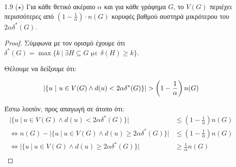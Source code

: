 \documentclass[a4paper, oneside, 11pt]{article}
\theoremstyle{definition}
\begin{document}
\begin{enumerate}
\begin{proof}
      \begin{align*}
         E[d] &= \frac{1}{{n(G) \choose 2}} \sum_{u, v \in V(G): u \neq v}
                  d(u, v)\\
              &= \frac{1}{{2^r \choose 2}} \sum_{u \in V(G)}
                  \sum_{v \in V(G): v \neq u} d(u, v)\\
              &= \frac{1}{\frac{2^r \cdot (2^r-1)}{2}}
                  \sum_{u \in V(G)} \sum_{k=1}^{r} k \cdot {r \choose k}\\
              &= \frac{2}{2^r (2^r - 1)} n(G) \sum_{k=1}^{r}
                  r {r-1 \choose k-1}\\
              &= \frac{2 \cdot 2^r \cdot r}{2^r (2^r - 1)} \sum_{k=0}^{r-1}
                  {r-1 \choose k}\\
              &= \frac{2 \cdot r \cdot 2^{r-1}}{2^r - 1}\\
              &= \frac{r \cdot 2^r}{2^r - 1}
      \end{align*}

   \end{proof}

\item[1.9 ($\star$)]
   Για κάθε θετικό ακέραιο $\alpha$ και για κάθε γράφημα $G$, το $V(G)$
   περιέχει περισσότερες από $\left( 1-\frac1\alpha \right) \cdot n(G)$
   κορυφές βαθμού αυστηρά μικρότερου του $2\alpha\delta^*(G)$.

   \begin{proof}
      Σύμφωνα με τον ορισμό έχουμε ότι
      $\delta^*(G) = \max \{ k\ |\ \exists H \subseteq G \text{ με }
       \delta(H) \geq k \}$.

      Θέλουμε να δείξουμε ότι:

      \[
         | \{ u\ |\ u \in V(G) \land d(u) < 2\alpha\delta^*(G) \} |
            > \left( 1 - \frac1\alpha \right) n(G)\\
      \]

      Έστω λοιπόν, προς απαγωγή σε άτοπο ότι:
      \begin{align*}
         | \{ u\ |\ u \in V(G) \land d(u) < 2\alpha\delta^*(G) \} |
            &\leq \left( 1 - \frac1\alpha \right) n(G)\\
         \Leftrightarrow
         n(G) - | \{ u\ |\ u \in V(G) \land d(u) \geq 2\alpha\delta^*(G) \} |
            &\leq \left( 1 - \frac1\alpha \right) n(G)\\ 
         \Leftrightarrow
         | \{ u\ |\ u \in V(G) \land d(u) \geq 2\alpha\delta^*(G) \} |
            &\geq \frac1\alpha n(G)\\
      \end{align*}


\end{proof}
\end{enumerate}
\end{document}
